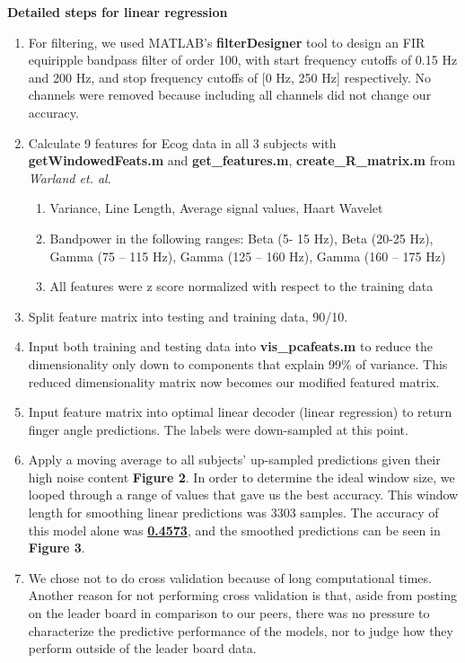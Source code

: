 \documentclass{article}
\begin{document}
	\textbf{Detailed steps for linear regression}
	\begin{enumerate}
	    \item For filtering, we used MATLAB’s \textbf{filterDesigner} tool to design an FIR equiripple bandpass filter of order 100, with start frequency cutoffs of 0.15 Hz and 200 Hz, and stop frequency cutoffs of [0 Hz, 250 Hz] respectively. No channels were removed because including all channels did not change our accuracy.
	   
	    \item Calculate 9 features for Ecog data in all 3 subjects with \textbf{getWindowedFeats.m} and \textbf{get\_features.m}, \textbf{create\_R\_matrix.m} from \textit{Warland et. al}.
	    
        \begin{enumerate}
            \item Variance, Line Length, Average signal values, Haart Wavelet
            \item Bandpower in the following ranges: Beta (5- 15 Hz), Beta (20-25 Hz), Gamma (75 – 115 Hz), Gamma (125 – 160 Hz), Gamma (160 – 175 Hz)
            \item All features were z score normalized with respect to the training data
        \end{enumerate}
        
        \item Split feature matrix into testing and training data, 90/10.
        
        \item Input both training and testing data into \textbf{vis\_pcafeats.m} to reduce the dimensionality only down to components that explain 99\% of variance. This reduced dimensionality matrix now becomes our modified featured matrix.
        
        \item Input feature matrix into optimal linear decoder (linear regression) to return finger angle predictions. The labels were down-sampled at this point.
        
        \item Apply a moving average to all subjects’ up-sampled predictions given their high noise content \textbf{Figure 2}. In order to determine the ideal window size, we looped through a range of values that gave us the best accuracy. This window length for smoothing linear predictions was 3303 samples. The accuracy of this model alone was \underline{\textbf{0.4573}}, and the smoothed predictions can be seen in \textbf{Figure 3}.
        
        \item We chose not to do cross validation because of long computational times. Another reason for not performing cross validation is that, aside from posting on the leader board in comparison to our peers, there was no pressure to characterize the predictive performance of the models, nor to judge how they perform outside of the leader board data.\\
    \end{enumerate}
\end{document}
